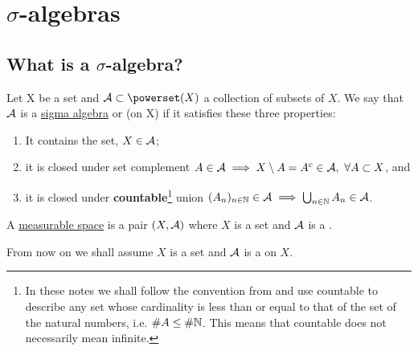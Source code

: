 
\chapter{\texorpdfstring{$\sigma$-algebras}{Sigma algebras}}

\section{What is a \texorpdfstring{$\sigma$-algebra}{sigma algebra}?}

\begin{dfn}
	Let X be a set and $\sa \subset \powerset(X)$ a collection of subsets of $X$. We say that $\mathcal{A}$ is a \underline{sigma algebra} or \siga (on X) if it satisfies these three properties:
	\begin{enumerate}
		\item It contains the set, $X \in \mathcal{A}$;
		\item it is closed under set complement $A \in \mathcal{A} \implies X \setminus A = A^c \in \mathcal{A},\ \forall A \subset X$, and
		\item it is closed under \textbf{countable}\footnote{In these notes we shall follow the convention from \cite[bottom of p. 7]{schilling2017} and use countable to describe any set whose cardinality is less than or equal to that of the set of the natural numbers, i.e. $\# A \leq \# \mathbb{N}$. This means that countable does not necessarily mean infinite.} union $(A_n)_{n \in \mathbb{N}} \in \mathcal{A} \implies \bigcup_{n \in \mathbb{N}} A_n \in \mathcal{A}$.
	\end{enumerate}
\end{dfn}

\begin{dfn}
	A \underline{measurable space} is a pair $(X, \mathcal{A})$ where $X$ is a set and $\mathcal{A}$ is a \siga.
\end{dfn}

From now on we shall assume $X$ is a set and $\mathcal{A}$ is a \siga on $X$.

